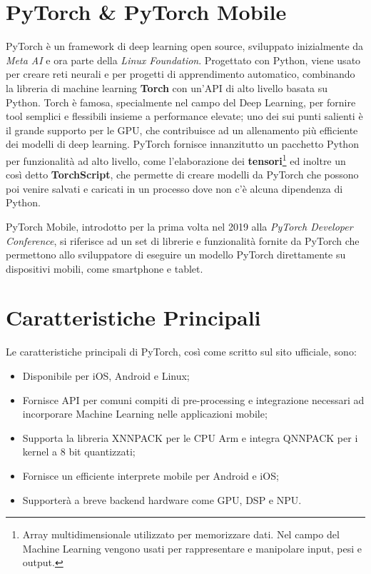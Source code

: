 \section{PyTorch \& PyTorch Mobile}
PyTorch\cite{Pytorch} è un framework di deep learning open source, sviluppato inizialmente da \textit{Meta AI} e ora parte della \textit{Linux Foundation}.
Progettato con Python, viene usato per creare reti neurali e per progetti di apprendimento automatico,
combinando la libreria di machine learning \textbf{Torch}\cite{Torch} con un’API di alto livello basata su Python. Torch è famosa, specialmente nel campo
del Deep Learning, per fornire tool semplici e flessibili insieme a performance elevate; uno dei sui punti salienti è il grande supporto per le GPU, che 
contribuisce ad un allenamento più efficiente dei modelli di deep learning.
PyTorch fornisce innanzitutto un pacchetto Python per funzionalità ad alto livello, come l'elaborazione dei \textbf{tensori}\footnote{Array multidimensionale utilizzato per memorizzare dati. Nel campo del Machine Learning vengono usati per rappresentare e manipolare input, pesi e output.}
ed inoltre un così detto \textbf{TorchScript}, che permette di creare modelli da PyTorch che possono poi venire salvati e caricati in un processo dove non c'è alcuna 
dipendenza di Python.

PyTorch Mobile\cite{PyTorchMed}, introdotto per la prima volta nel 2019 alla \textit{PyTorch Developer Conference}, si riferisce ad un set di librerie e funzionalità fornite da PyTorch che
permettono allo sviluppatore di eseguire un modello PyTorch direttamente su dispositivi mobili, come smartphone e tablet.

\section{Caratteristiche Principali}
Le caratteristiche principali di PyTorch, così come scritto sul sito ufficiale\cite{PyTorchOfficial}, sono:
\begin{itemize}
    \item Disponibile per iOS, Android e Linux;
    \item Fornisce API per comuni compiti di pre-processing e integrazione necessari ad incorporare Machine Learning nelle applicazioni mobile;
    \item Supporta la libreria XNNPACK per le CPU Arm e integra QNNPACK per i kernel a 8 bit quantizzati;
    \item Fornisce un efficiente interprete mobile per Android e iOS;
    \item Supporterà a breve backend hardware come GPU, DSP e NPU.
\end{itemize}

